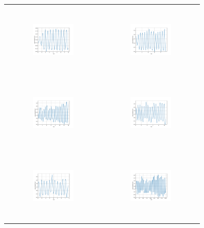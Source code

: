 \begin{figure}[H]
\begin{center}
\begin{tabular}{cc}
\includegraphics[width=0.45\textwidth, height=3.5cm]{graph/omega=3.00_A=1_wave.pdf}
&
\includegraphics[width=0.45\textwidth, height=3.5cm]{graph/omega=3.00_A=2_wave.pdf}\\
\includegraphics[width=0.45\textwidth, height=3.5cm]{graph/omega=3.00_A=3_wave.pdf}
&
\includegraphics[width=0.45\textwidth, height=3.5cm]{graph/omega=3.00_A=4_wave.pdf}\\
\includegraphics[width=0.45\textwidth, height=3.5cm]{graph/omega=3.00_A=5_wave.pdf}
&
\includegraphics[width=0.45\textwidth, height=3.5cm]{graph/omega=3.00_A=6_wave.pdf}\\

\end{tabular}
\end{center}
\end{figure}
